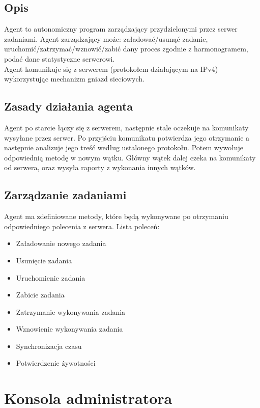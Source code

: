 \documentclass[10pt,a4paper]{article}
\begin{document}
		\subsection{Opis}
			Agent to autonomiczny program zarządzający przydzielonymi przez serwer zadaniami. Agent zarządzający może: załadować/usunąć zadanie, uruchomić/zatrzymać/wznowić/zabić dany proces zgodnie z harmonogramem, podać dane statystyczne serwerowi. \\
			Agent komunikuje się z serwerem (protokołem działającym na IPv4) wykorzystując mechanizm gniazd sieciowych. \\
		
		\subsection{Zasady działania agenta}
			Agent po starcie łączy się z serwerem, następnie stale oczekuje na komunikaty wysyłane przez serwer. Po przyjściu komunikatu potwierdza jego otrzymanie a następnie analizuje jego treść według ustalonego protokołu. Potem wywołuje odpowiednią metodę w nowym wątku. Główny wątek dalej czeka na komunikaty od serwera, oraz wysyła raporty z wykonania innych wątków. \\
		
		\subsection{Zarządzanie zadaniami}
			Agent ma zdefiniowane metody, które będą wykonywane po otrzymaniu odpowiedniego polecenia z serwera. Lista poleceń: \\
			
			\begin{itemize}
				\item Załadowanie nowego zadania
				\item Usunięcie zadania
				\item Uruchomienie zadania
				\item Zabicie zadania
				\item Zatrzymanie wykonywania zadania
				\item Wznowienie wykonywania zadania
				\item Synchronizacja czasu
				\item Potwierdzenie żywotności 
			\end{itemize}

    
    
    \section{Konsola administratora}
\end{document}
